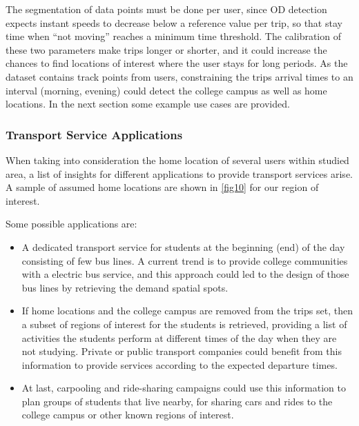 \documentclass[]{elsarticle} %
\begin{document}
The segmentation of data points must be done per user, since OD
detection expects instant speeds to decrease below a reference value per
trip, so that stay time when ``not moving'' reaches a minimum time
threshold. The calibration of these two parameters make trips longer or
shorter, and it could increase the chances to find locations of interest
where the user stays for long periods. As the dataset contains track
points from users, constraining the trips arrival times to an interval
(morning, evening) could detect the college campus as well as home
locations. In the next section some example use cases are provided.

\hypertarget{transport-service-applications}{%
\subsubsection{Transport Service
Applications}\label{transport-service-applications}}

When taking into consideration the home location of several users within
studied area, a list of insights for different applications to provide
transport services arise. A sample of assumed home locations are shown
in \ref{fig10} for our region of interest.

Some possible applications are:

\begin{itemize}
\item
  A dedicated transport service for students at the beginning (end) of
  the day consisting of few bus lines. A current trend is to provide
  college communities with a electric bus service, and this approach
  could led to the design of those bus lines by retrieving the demand
  spatial spots.
\item
  If home locations and the college campus are removed from the trips
  set, then a subset of regions of interest for the students is
  retrieved, providing a list of activities the students perform at
  different times of the day when they are not studying. Private or
  public transport companies could benefit from this information to
  provide services according to the expected departure times.
\item
  At last, carpooling and ride-sharing campaigns could use this
  information to plan groups of students that live nearby, for sharing
  cars and rides to the college campus or other known regions of
  interest.
\end{itemize}

\renewcommand\refname{References}

\end{document}

